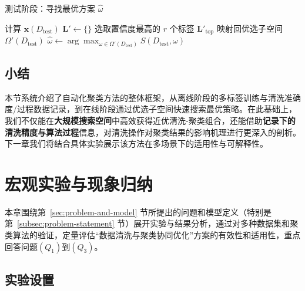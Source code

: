 \documentclass[10pt]{article} %
\numberwithin{equation}{section}
\begin{document}
\begin{algorithm}[t]
\caption{测试阶段：寻找最优方案 \(\hat{\omega}\)}
\label{alg:test-phase}

计算 $\mathbf{x}(D_{\text{test}})$\;
$\mathbf{L}' \leftarrow \{\}$\;
选取置信度最高的 $r$ 个标签 $\mathbf{L}'_{\mathrm{top}}$\;
映射回优选子空间 $\Omega'(D_{\text{test}})$\;
$\hat{\omega} \leftarrow \arg\max_{\omega \in \Omega'(D_{\text{test}})}S(D_{\text{test}}, \omega)$\;
\KwRet{$\hat{\omega}$}
\end{algorithm}

\subsection{小结}
本节系统介绍了自动化聚类方法的整体框架，从离线阶段的多标签训练与清洗准确度/过程数据记录，到在线阶段通过优选子空间快速搜索最优策略。在此基础上，我们不仅能在\textbf{大规模搜索空间}中高效获得近优清洗-聚类组合，还能借助\textbf{记录下的清洗精度与算法过程}信息，对清洗操作对聚类结果的影响机理进行更深入的剖析。下一章我们将结合具体实验展示该方法在多场景下的适用性与可解释性。



\section{宏观实验与现象归纳}
\label{sec:chapter5}

本章围绕第~\ref{sec:problem-and-model} 节所提出的问题和模型定义（特别是第~\ref{subsec:problem-statement} 节）展开实验与结果分析，通过对多种数据集和聚类算法的验证，定量评估“数据清洗与聚类协同优化”方案的有效性和适用性，重点回答问题\((Q_1)\)到\((Q_3)\)。
\vspace{-0.5em}
\subsection{\textcolor[rgb]{0.00,0.07,1.00}{实验设置}}\label{sec:exp_setting}
\end{document}

